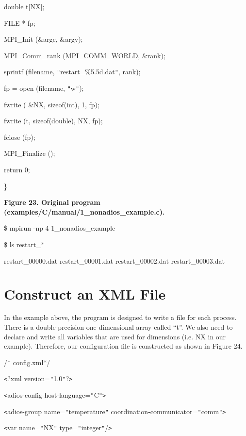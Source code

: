 double      t[NX];

FILE          * fp;

MPI\_Init (\&argc, \&argv);

MPI\_Comm\_rank (MPI\_COMM\_WORLD, \&rank);

sprintf (filename, \texttt{"}restart\_\%5.5d.dat\texttt{"}, rank);

fp = open (filename, \texttt{"}w\texttt{"});

fwrite ( \&NX, sizeof(int), 1, fp);

fwrite (t,  sizeof(double), NX, fp);

fclose (fp);

MPI\_Finalize ();

return 0;

\leftskip=0pt
\}

\label{HRef119579280}\label{HToc144350182}

\leftskip=18pt
{\color{color20} \textbf{Figure 23. Original program (examples/C/manual/1\_nonadios\_example.c).}}

\leftskip=0pt
\$ mpirun -np 4 1\_nonadios\_example

\$ ls restart\_*

restart\_00000.dat  restart\_00001.dat  restart\_00002.dat  restart\_00003.dat\label{HToc84890292}\label{HToc212016668}\label{HToc212016910}\label{HToc182553441}

\section{Construct an XML File}

In the example above, the program is designed to write a file for each process. 
There is a double-precision one-dimensional array called ``t''. We also need to 
declare and write all variables that are used for dimensions (i.e. NX in our example). 
Therefore, our configuration file is constructed as shown in Figure 24.

/* config.xml*/

\texttt{<}?xml version=\texttt{"}1.0\texttt{"}?\texttt{>}

\texttt{<}adios-config host-language=\texttt{"}C\texttt{"}\texttt{>}

\parindent=14pt
\texttt{<}adios-group name=\texttt{"}temperature\texttt{"} coordination-communicator=\texttt{"}comm\texttt{"}\texttt{>}

\parindent=28pt
\texttt{<}var name=\texttt{"}NX\texttt{"} type=\texttt{"}integer\texttt{"}/\texttt{>}

